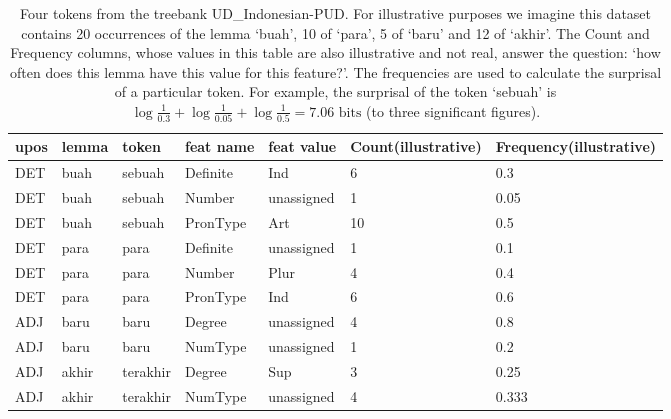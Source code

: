 \documentclass[USenglish]{article}
\begin{document}
\begin{table}[h]
    \centering
    \caption{Four tokens from the treebank UD\_Indonesian-PUD. For illustrative purposes we imagine this dataset contains 20 occurrences of the lemma `buah', 10 of `para', 5 of `baru' and 12 of `akhir'. The Count and Frequency columns, whose values in this table are also illustrative and not real, answer the question: `how often does this lemma have this value for this feature?'. The frequencies are used to calculate the surprisal of a particular token. For example, the surprisal of the token `sebuah' is $\log{\frac{1}{0.3}}+\log{\frac{1}{0.05}}+\log{\frac{1}{0.5}} = 7.06\text{ bits}$ (to three significant figures).} %
    \label{tab:unassigned_ex_SPLIT}   
    \begin{tabular}{p{0.7cm}p{1cm}p{1.4cm}p{1.3cm}p{1.5cm}p{1.4cm}p{1.6cm}}
\toprule

upos&lemma	&token	&feat name & feat value & Count\newline (illustrative) & Frequency\newline (illustrative)	\\ \midrule

DET & buah & sebuah & Definite& Ind & 6 & 0.3\\
DET & buah & sebuah & Number& unassigned & 1 & 0.05\\
DET & buah & sebuah & PronType& Art & 10 & 0.5
\\\midrule
DET & para	& para	&Definite & unassigned & 1 & 0.1\\
DET & para	& para	&Number & Plur & 4 & 0.4\\
DET & para	& para	&PronType & Ind & 6 & 0.6
\\\midrule
ADJ&baru	&baru& Degree&unassigned & 4 & 0.8\\
ADJ&baru	&baru& NumType&unassigned & 1 & 0.2 \\\midrule
ADJ & akhir	&terakhir&	Degree& Sup & 3 & 0.25\\
ADJ & akhir	&terakhir&	NumType & unassigned & 4 & 0.333\\
\bottomrule
\end{tabular}
\end{table}
\end{document}
